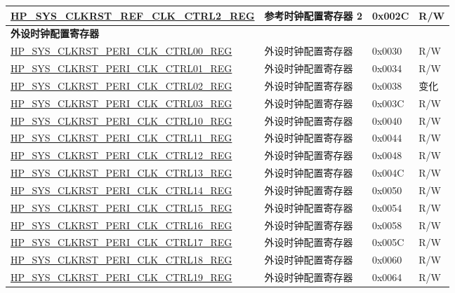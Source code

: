 \begin{longtable}{ | p{7.5cm} | p{6.2cm} | p{1.3cm} | p{1cm} | }
\hyperref[regdesc:HPSYSCLKRSTREFCLKCTRL2REG]{HP\_SYS\_CLKRST\_REF\_CLK\_CTRL2\_REG} & 参考时钟配置寄存器 2 & 0x002C & R/W \\ \hline
\multicolumn{4}{|l|}{\textbf{外设时钟配置寄存器}} \\ \hline
\hyperref[regdesc:HPSYSCLKRSTPERICLKCTRL00REG]{HP\_SYS\_CLKRST\_PERI\_CLK\_CTRL00\_REG} & 外设时钟配置寄存器 & 0x0030 & R/W \\ \hline
\hyperref[regdesc:HPSYSCLKRSTPERICLKCTRL01REG]{HP\_SYS\_CLKRST\_PERI\_CLK\_CTRL01\_REG} & 外设时钟配置寄存器 & 0x0034 & R/W \\ \hline
\hyperref[regdesc:HPSYSCLKRSTPERICLKCTRL02REG]{HP\_SYS\_CLKRST\_PERI\_CLK\_CTRL02\_REG} & 外设时钟配置寄存器 & 0x0038 & 变化 \\ \hline
\hyperref[regdesc:HPSYSCLKRSTPERICLKCTRL03REG]{HP\_SYS\_CLKRST\_PERI\_CLK\_CTRL03\_REG} & 外设时钟配置寄存器 & 0x003C & R/W \\ \hline
\hyperref[regdesc:HPSYSCLKRSTPERICLKCTRL10REG]{HP\_SYS\_CLKRST\_PERI\_CLK\_CTRL10\_REG} & 外设时钟配置寄存器  & 0x0040 & R/W \\ \hline
\hyperref[regdesc:HPSYSCLKRSTPERICLKCTRL11REG]{HP\_SYS\_CLKRST\_PERI\_CLK\_CTRL11\_REG} & 外设时钟配置寄存器  & 0x0044 & R/W \\ \hline
\hyperref[regdesc:HPSYSCLKRSTPERICLKCTRL12REG]{HP\_SYS\_CLKRST\_PERI\_CLK\_CTRL12\_REG} & 外设时钟配置寄存器  & 0x0048 & R/W \\ \hline
\hyperref[regdesc:HPSYSCLKRSTPERICLKCTRL13REG]{HP\_SYS\_CLKRST\_PERI\_CLK\_CTRL13\_REG} & 外设时钟配置寄存器  & 0x004C & R/W \\ \hline
\hyperref[regdesc:HPSYSCLKRSTPERICLKCTRL14REG]{HP\_SYS\_CLKRST\_PERI\_CLK\_CTRL14\_REG} & 外设时钟配置寄存器  & 0x0050 & R/W \\ \hline
\hyperref[regdesc:HPSYSCLKRSTPERICLKCTRL15REG]{HP\_SYS\_CLKRST\_PERI\_CLK\_CTRL15\_REG} & 外设时钟配置寄存器  & 0x0054 & R/W \\ \hline
\hyperref[regdesc:HPSYSCLKRSTPERICLKCTRL16REG]{HP\_SYS\_CLKRST\_PERI\_CLK\_CTRL16\_REG} & 外设时钟配置寄存器  & 0x0058 & R/W \\ \hline
\hyperref[regdesc:HPSYSCLKRSTPERICLKCTRL17REG]{HP\_SYS\_CLKRST\_PERI\_CLK\_CTRL17\_REG} & 外设时钟配置寄存器  & 0x005C & R/W \\ \hline
\hyperref[regdesc:HPSYSCLKRSTPERICLKCTRL18REG]{HP\_SYS\_CLKRST\_PERI\_CLK\_CTRL18\_REG} & 外设时钟配置寄存器  & 0x0060 & R/W \\ \hline
\hyperref[regdesc:HPSYSCLKRSTPERICLKCTRL19REG]{HP\_SYS\_CLKRST\_PERI\_CLK\_CTRL19\_REG} & 外设时钟配置寄存器  & 0x0064 & R/W \\ \hline

\end{longtable}
